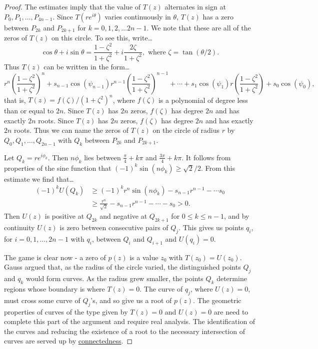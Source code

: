 \begin{proof}
The estimates imply that the value of $T(z)$ alternates in sign at $P_0, P_1, \dots, P_{4n-1}$. Since $T(re^{i \theta})$ varies continuously in $\theta$,
$T(z)$ has a zero between $P_{2k}$ and $P_{2k+1}$ for $k = 0, 1, 2, \dots 2n-1$. We note that these are all of the zeros of $T(z)$ on this circle. To see this,
write\dots
$$\cos \theta + i \sin \theta = \frac{1 - \zeta^2}{1 + \zeta^2} + i \frac{2\zeta}{1 + \zeta^2}, \textrm{ where } \zeta = \tan(\theta/2).$$
Thus $T(z)$ can be written in the form\dots
$$r^n\left( \frac{1-\zeta^2}{1 + \zeta^2} \right)^n + s_{n-1}\cos(\psi_{n-1})r^{n-1}\left( \frac{1-\zeta^2}{1 + \zeta^2} \right)^{n-1} + \cdots + s_{1}\cos(\psi_{1})r\left( \frac{1-\zeta^2}{1 + \zeta^2} \right) + s_0 \cos(\psi_0),$$
that is, $T(z) = f(\zeta)/(1 + \zeta^2)^n$, where $f(\zeta)$ is a polynomial of degree less than or equal to $2n$. Since $T(z)$ has $2n$ zeros, $f(\zeta)$ has degree $2n$ and has exactly $2n$ roots. Since $T(z)$ has $2n$ zeros, $f(\zeta)$
has degree $2n$ and has exactly $2n$ roots. Thus we can name the zeros of $T(z)$ on the circle of radius $r$ by $Q_0, Q_1, \dots, Q_{2n - 1}$ with $Q_k$ between $P_{2k}$ and $P_{2k+1}$.

Let $Q_k = re^{i \phi_k}$. Then $n \phi_k$ lies between $\frac{\pi}{4} + k \pi$ and $\frac{3\pi}{4} + k\pi$.
It follows from properties of the sine function that $(-1)^k \sin(n \phi_k) \geq \sqrt{2}/2$. From this estimate we find that\dots
\begin{align*}
(-1)^kU(Q_k) &\geq (-1)^kr^n\sin(n \phi_k) - s_{n-1} r^{n-1} - \cdots s_0\\
			 &\geq \frac{r^n}{\sqrt{2}} - s_{n-1}r^{n-1} - \cdots - s_0 > 0.
\end{align*}
Then $U(z)$ is positive at $Q_{2k}$ and negative at $Q_{2k+1}$ for $0 \leq k \leq n-1$, and by continuity $U(z)$ is zero between consecutive pairs of $Q_j$. This gives us points $q_i$, for $i = 0,1,\dots,2n-1$ with $q_i$, between $Q_i$
and $Q_{i+1}$ and $U(q_i) = 0$.

The game is clear now - a zero of $p(z)$ is a value $z_0$ with $T(z_0) = U(z_0)$. Gauss argued that, as the radius of the circle varied, the distinguished points $Q_j$ and $q_k$ would form curves. As the radius grew smaller, the points $Q_k$
determine regions whose boundary is where $T(z) = 0$. The curve of $q_j$, where $U(z) = 0$, must cross some curve of $Q_j$'s, and so give us a root of $p(z)$. The geometric properties of curves of the type given by $T(z) = 0$ and $U(z) = 0$
are need to complete this part of the argument and require real analysis. The identification of the curves and reducing the existence of a root to the necessary intersection of curves are served up by \hyperref[connectedness]{connectedness}.
\end{proof}